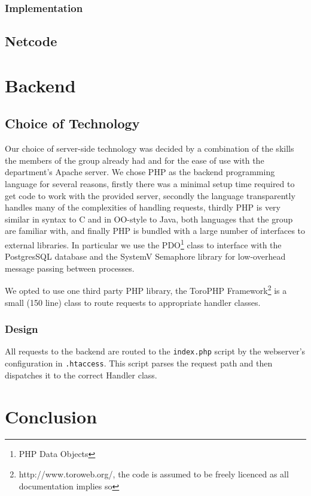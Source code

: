 \documentclass[12pt]{amsart}
\begin{document}
    \subsubsection{Implementation}
      \begin{flushleft}
      \end{flushleft}
  \subsection{Netcode}
    \begin{flushleft}
    \end{flushleft}
\section{Backend}
  \subsection{Choice of Technology}
    \begin{flushleft}
      Our choice of server-side technology was decided by a combination of the skills the members of the group already had and for the ease of use with the department's Apache server. We chose PHP as the backend programming language for several reasons, firstly there was a minimal setup time required to get code to work with the provided server, secondly the language transparently handles many of the complexities of handling requests, thirdly PHP is very similar in syntax to C and in OO-style to Java, both languages that the group are familiar with, and finally PHP is bundled with a large number of interfaces to external libraries.
In particular we use the PDO\footnote{PHP Data Objects} class to interface with the PostgresSQL database and the SystemV Semaphore library for low-overhead message passing between processes.

We opted to use one third party PHP library, the ToroPHP Framework\footnote{http://www.toroweb.org/, the code is assumed to be freely licenced as all documentation implies so} is a small (150 line) class to route requests to appropriate handler classes.
    \end{flushleft}

  \subsubsection{Design}
    \begin{flushleft}
      All requests to the backend are routed to the \verb|index.php| script by the webserver's configuration in \verb|.htaccess|.
      This script parses the request path and then dispatches it to the correct Handler class.
    \end{flushleft}
\section{Conclusion}
\end{document}
